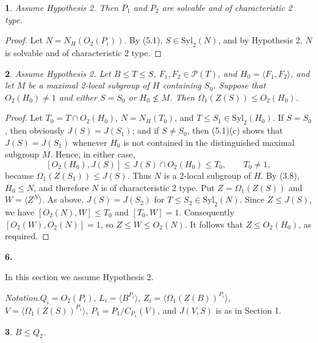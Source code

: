 \documentclass[11pt]{article}
\theoremstyle{plain}
\theoremstyle{stmplain}
\newtheorem{stm}{}[section]
\newcommand{\sect}[1]{\stepcounter{section}\par\vspace{14pt}%
  \begin{center}\textbf{#1.}\end{center}\vspace{2pt}}
\begin{document}
\begin{stm}\label{st:5.3}
Assume Hypothesis 2. Then $P_1$ and $P_2$ are solvable and of characteristic 2
type.
\end{stm}

\begin{proof}
Let $N = N_H(O_2(P_i))$. By (5.1), $S \in \mathrm{Syl}_2(N)$, and by Hypothesis
2, $N$ is solvable and of characteristic 2 type.
\end{proof}

\begin{stm}\label{st:5.4}
Assume Hypothesis 2. Let $B \le T \le S$, $F_1, F_2 \in \mathcal{P}(T)$, and
$H_0 = \langle F_1, F_2 \rangle$, and let $M$ be a maximal 2-local subgroup of
$H$ containing $S_0$. Suppose that $O_2(H_0) \ne 1$ and either $S = S_0$ or
$H_0 \nleq M$. Then $\Omega_1(Z(S)) \le O_2(H_0)$.
\end{stm}

\begin{proof}
Let $T_0 = T \cap O_2(H_0)$, $N = N_H(T_0)$, and $T \le S_1 \in
\mathrm{Syl}_2(H_0)$. If $S = S_0$, then obviously $J(S) = J(S_1)$; and if $S
\ne S_0$, then (5.1)(c) shows that $J(S)=J(S_1)$ whenever $H_0$ is not
contained in the distinguished maximal subgroup $M$. Hence, in either case,
\[
  [O_2(H_0),J(S)]\le J(S)\cap O_2(H_0)\le T_0,
  \qquad T_0\ne1,
\]
because $\Omega_1(Z(S_1))\le J(S)$. Thus $N$ is a 2-local subgroup of $H$.
By (3.8), $H_0\le N$, and therefore $N$ is of characteristic 2 type.
Put $Z=\Omega_1(Z(S))$ and $W=\langle Z^N\rangle$. As above,
$J(S)=J(S_2)$ for $T\le S_2\in\mathrm{Syl}_2(N)$. Since $Z\le J(S)$,
we have $[O_2(N),W]\le T_0$ and $[T_0,W]=1$. Consequently
$[O_2(W),O_2(N)]=1$, so $Z\le W\le O_2(N)$. It follows that
$Z\le O_2(H_0)$, as required.
\end{proof}

\sect{6}

\noindent In this section we assume Hypothesis 2.

\smallskip
\noindent\textit{Notation.}\quad $Q_i=O_2(P_i)$, $L_i=\langle B^{P_i}\rangle$,
$Z_i=\langle\Omega_1(Z(B))^{P_i}\rangle$, $V=\langle\Omega_1(Z(S))^{P_1}\rangle$,
$\overline P_1=P_1/C_{P_1}(V)$, and $J(V,S)$ is as in Section 1.

\begin{stm}\label{st:6.1}
$B\le Q_2$.
\end{stm}
\end{document}
